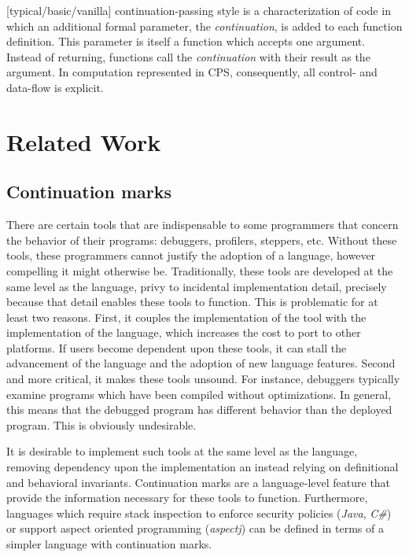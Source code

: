 \documentclass[ms]{byuprop}
\newcounter{definition}
\begin{document}
[typical/basic/vanilla] continuation-passing style is a characterization of code in which an additional formal 
parameter, the \emph{continuation}, is added to each function definition. This parameter 
is itself a function which accepts one argument. Instead of returning, functions call 
the \emph{continuation} with their result as the argument. In computation represented in 
CPS, consequently, all control- and data-flow is explicit.

\section{Related Work}

\subsection{Continuation marks}

There are certain tools that are indispensable to some programmers that concern the
behavior of their programs: debuggers, profilers, steppers, etc. Without these tools,
these programmers cannot justify the adoption of a language, however compelling it might
otherwise be. Traditionally, these tools are developed at the same level as the 
language, privy to incidental implementation detail, precisely because that detail 
enables these tools to function. This is problematic for at least two reasons. First, 
it couples the implementation of the tool with the implementation of the language, which
increases the cost to port to other platforms. If users become dependent upon these tools,
it can stall the advancement of the language and the adoption of new language features.
Second and more critical, it makes these tools unsound. For instance, debuggers typically
examine programs which have been compiled without optimizations. In general, this means 
that the debugged program has different behavior than the deployed program. This is 
obviously undesirable.

It is desirable to implement such tools at the same level as the language, removing
dependency upon the implementation an instead relying on definitional and behavioral
invariants. Continuation marks are a language-level feature that provide the information
necessary for these tools to function. Furthermore, languages which require stack
inspection to enforce security policies (\emph{Java}, \emph{C\#}) or support aspect
oriented programming (\emph{aspectj}) can be defined in terms of a simpler language with
continuation marks.
\end{document}
